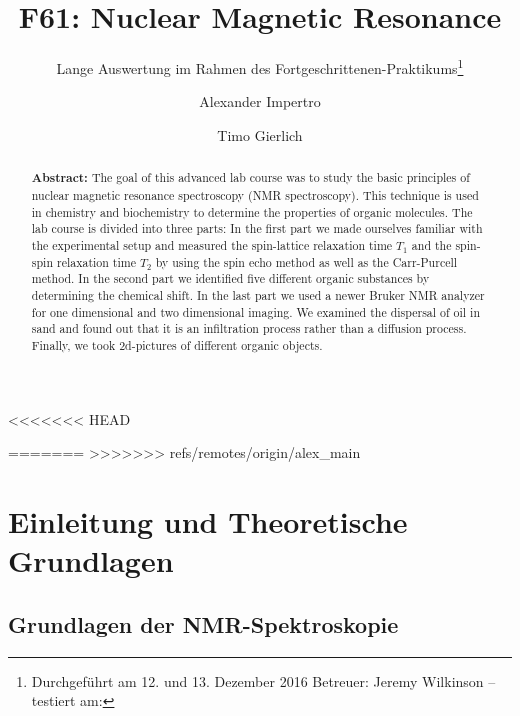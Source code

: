 \documentclass[a4paper]{scrartcl} %
\begin{document}
\author{Alexander Impertro \and Timo Gierlich}
\title{F61: Nuclear Magnetic Resonance}
\subtitle{Lange Auswertung im Rahmen des Fortgeschrittenen-Praktikums\footnote{Durchgeführt am 12. und 13. Dezember 2016 \newline Betreuer: Jeremy Wilkinson -- testiert am:}}
\maketitle



<<<<<<< HEAD
\newpage

\vfill
=======
>>>>>>> refs/remotes/origin/alex_main

\begin{abstract}


	\textbf{Abstract:} The goal of this advanced lab course was to study the basic principles of nuclear magnetic resonance spectroscopy (NMR spectroscopy). This technique is used in chemistry and biochemistry to determine the properties of organic molecules. The lab course is divided into three parts: In the first part we made ourselves familiar with the experimental setup and measured the spin-lattice relaxation time $T_1$ and the spin-spin relaxation time $T_2$ by using the spin echo method as well as the Carr-Purcell method. In the second part we identified five different organic substances by determining the chemical  shift. In the last part we used a newer Bruker NMR analyzer for one dimensional and two dimensional imaging. We examined the dispersal of oil in sand and found out that it is an infiltration process rather than a diffusion process. Finally, we took 2d-pictures of different organic objects.
\end{abstract}

\newpage

\tableofcontents

\newpage

\section{Einleitung und Theoretische Grundlagen}

\subsection{Grundlagen der NMR-Spektroskopie}
\end{document}

